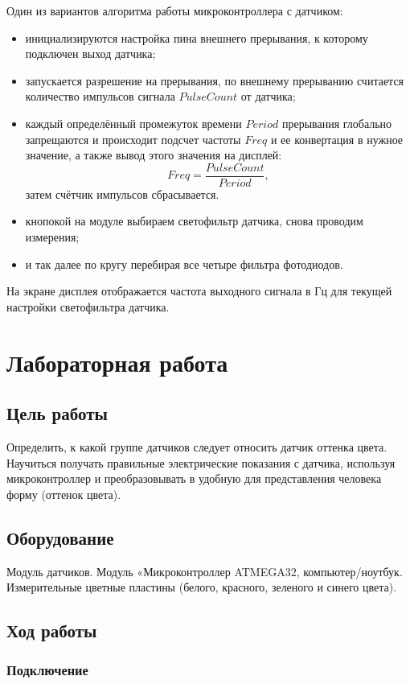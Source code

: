 \documentclass[12pt]{article}
\begin{document}
Один из вариантов алгоритма работы микроконтроллера с датчиком:
\begin{itemize}
    \item инициализируются настройка пина внешнего прерывания, к которому подключен выход датчика;
    \item запускается разрешение на прерывания, по внешнему прерыванию считается количество импульсов сигнала \(PulseCount\) от датчика;
    \item каждый определённый промежуток времени \(Period\) прерывания глобально запрещаются и происходит подсчет частоты \(Freq\) и ее конвертация в нужное значение, а также вывод этого значения на дисплей:
    \[Freq=\frac{PulseCount}{Period},\]
    затем счётчик импульсов сбрасывается.
    \item кнопокой на модуле выбираем светофильтр датчика, снова проводим измерения;
    \item и так далее по кругу перебирая все четыре фильтра фотодиодов.
\end{itemize}

На экране дисплея отображается частота выходного сигнала в Гц для текущей настройки светофильтра датчика.

\section{Лабораторная работа}
\subsection{Цель работы}
Определить, к какой группе датчиков следует относить датчик оттенка цвета. Научиться получать правильные электрические показания с датчика, используя микроконтроллер и преобразовывать в удобную для представления человека форму (оттенок цвета).

\subsection{Оборудование}
Модуль датчиков. Модуль «Микроконтроллер ATMEGA32, компьютер/ноутбук. Измерительные цветные пластины (белого, красного, зеленого и синего цвета).

\subsection{Ход работы}
\subsubsection{Подключение}
\end{document}

